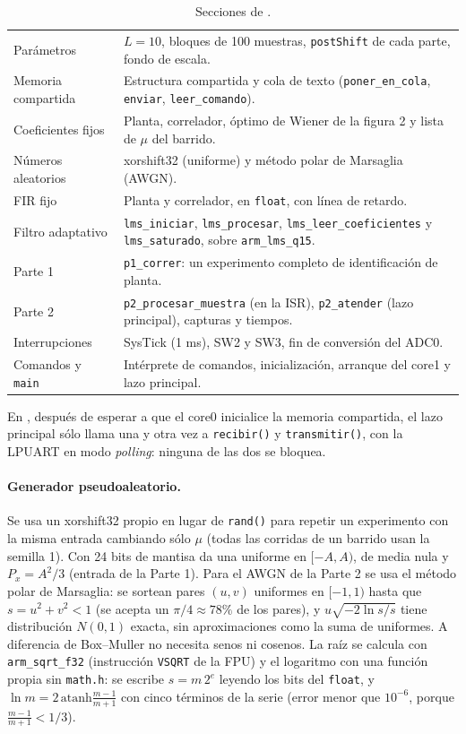 \documentclass[11pt,a4paper]{article}
\newcommand{\lmsq}{\texttt{arm\_lms\_q15}}
\begin{document}
\begin{table}[H]
\centering
\caption{Secciones de .}
\small
\begin{tabular}{p{3.6cm}p{11cm}}
\toprule
Parámetros & $L = 10$, bloques de 100 muestras, \texttt{postShift} de cada parte, fondo de escala. \\
Memoria compartida & Estructura compartida y cola de texto (\texttt{poner\_en\_cola}, \texttt{enviar}, \texttt{leer\_comando}). \\
Coeficientes fijos & Planta, correlador, óptimo de Wiener de la figura 2 y lista de $\mu$ del barrido. \\
Números aleatorios & xorshift32 (uniforme) y método polar de Marsaglia (AWGN). \\
FIR fijo & Planta y correlador, en \texttt{float}, con línea de retardo. \\
Filtro adaptativo & \texttt{lms\_iniciar}, \texttt{lms\_procesar}, \texttt{lms\_leer\_coeficientes} y \texttt{lms\_saturado}, sobre \lmsq. \\
Parte 1 & \texttt{p1\_correr}: un experimento completo de identificación de planta. \\
Parte 2 & \texttt{p2\_procesar\_muestra} (en la ISR), \texttt{p2\_atender} (lazo principal), capturas y tiempos. \\
Interrupciones & SysTick (1 ms), SW2 y SW3, fin de conversión del ADC0. \\
Comandos y \texttt{main} & Intérprete de comandos, inicialización, arranque del core1 y lazo principal. \\
\bottomrule
\end{tabular}
\end{table}

En , después de esperar a que el core0 inicialice la memoria compartida, el
lazo principal sólo llama una y otra vez a \texttt{recibir()} y \texttt{transmitir()}, con la
LPUART en modo \emph{polling}: ninguna de las dos se bloquea.

\paragraph{Generador pseudoaleatorio.} Se usa un xorshift32 propio en lugar de \texttt{rand()}
para repetir un experimento con la misma entrada cambiando sólo $\mu$ (todas las corridas de un
barrido usan la semilla 1). Con 24 bits de mantisa da una uniforme en $[-A, A)$, de media nula y
$P_x = A^2/3$ (entrada de la Parte 1). Para el AWGN de la Parte 2 se usa el método polar de
Marsaglia: se sortean pares $(u, v)$ uniformes en $[-1,1)$ hasta que $s = u^2 + v^2 < 1$
(se acepta un $\pi/4 \approx 78\%$ de los pares), y $u\sqrt{-2\ln s / s}$ tiene distribución
$N(0,1)$ exacta, sin aproximaciones como la suma de uniformes. A diferencia de Box--Muller no
necesita senos ni cosenos. La raíz se calcula con
\texttt{arm\_sqrt\_f32} (instrucción \texttt{VSQRT} de la FPU) y el logaritmo con una función
propia sin \texttt{math.h}: se escribe $s = m\,2^{e}$ leyendo los bits del \texttt{float}, y
$\ln m = 2\,\mathrm{atanh}\frac{m-1}{m+1}$ con cinco términos de la serie (error menor que
$10^{-6}$, porque $\frac{m-1}{m+1} < 1/3$).
\end{document}
